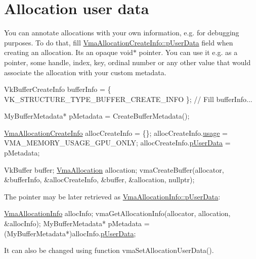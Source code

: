 \hypertarget{allocation_annotation_allocation_user_data}{}\section{Allocation user data}\label{allocation_annotation_allocation_user_data}
You can annotate allocations with your own information, e.\+g. for debugging purposes. To do that, fill \hyperlink{structVmaAllocationCreateInfo_a8259e85c272683434f4abb4ddddffe19}{Vma\+Allocation\+Create\+Info\+::p\+User\+Data} field when creating an allocation. It\textquotesingle{}s an opaque {\ttfamily void$\ast$} pointer. You can use it e.\+g. as a pointer, some handle, index, key, ordinal number or any other value that would associate the allocation with your custom metadata.


\begin{DoxyCode}
VkBufferCreateInfo bufferInfo = \{ VK\_STRUCTURE\_TYPE\_BUFFER\_CREATE\_INFO \};
\textcolor{comment}{// Fill bufferInfo...}

MyBufferMetadata* pMetadata = CreateBufferMetadata();

\hyperlink{structVmaAllocationCreateInfo}{VmaAllocationCreateInfo} allocCreateInfo = \{\};
allocCreateInfo.\hyperlink{structVmaAllocationCreateInfo_accb8b06b1f677d858cb9af20705fa910}{usage} = VMA\_MEMORY\_USAGE\_GPU\_ONLY;
allocCreateInfo.\hyperlink{structVmaAllocationCreateInfo_a8259e85c272683434f4abb4ddddffe19}{pUserData} = pMetadata;

VkBuffer buffer;
\hyperlink{structVmaAllocation}{VmaAllocation} allocation;
vmaCreateBuffer(allocator, &bufferInfo, &allocCreateInfo, &buffer, &allocation, \textcolor{keyword}{nullptr});
\end{DoxyCode}


The pointer may be later retrieved as \hyperlink{structVmaAllocationInfo_adc507656149c04de7ed95d0042ba2a13}{Vma\+Allocation\+Info\+::p\+User\+Data}\+:


\begin{DoxyCode}
\hyperlink{structVmaAllocationInfo}{VmaAllocationInfo} allocInfo;
vmaGetAllocationInfo(allocator, allocation, &allocInfo);
MyBufferMetadata* pMetadata = (MyBufferMetadata*)allocInfo.\hyperlink{structVmaAllocationInfo_adc507656149c04de7ed95d0042ba2a13}{pUserData};
\end{DoxyCode}


It can also be changed using function vma\+Set\+Allocation\+User\+Data().

